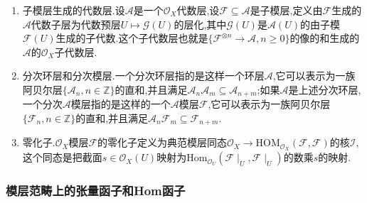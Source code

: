 \begin{enumerate}
\begin{itemize}
	\end{itemize}
	\item 子模层生成的代数层.设$\mathscr{A}$是一个$\mathscr{O}_X$代数层,设$\mathscr{F}\subseteq\mathscr{A}$是子模层,定义由$\mathscr{F}$生成的$\mathscr{A}$代数子层为代数预层$U\mapsto\mathscr{G}(U)$的层化,其中$\mathscr{G}(U)$是$\mathscr{A}(U)$的由子模$\mathscr{F}(U)$生成的子代数.这个子代数层也就是$\{\mathscr{F}^{\otimes n}\to\mathscr{A},n\ge0\}$的像的和生成的$\mathscr{A}$的$\mathscr{O}_X$子代数层.
	\item 分次环层和分次模层.一个分次环层指的是这样一个环层$\mathscr{A}$,它可以表示为一族阿贝尔层$\{\mathscr{A}_n,n\in\mathbb{Z}\}$的直和,并且满足$\mathscr{A}_n\mathscr{A}_m\subseteq\mathscr{A}_{n+m}$;如果$\mathscr{A}$是上述分次环层,一个分次$\mathscr{A}$模层指的是这样的一个$\mathscr{A}$模层$\mathscr{F}$,它可以表示为一族阿贝尔层$\{\mathscr{F}_n,n\in\mathbb{Z}\}$的直和,并且满足$\mathscr{A}_n\mathscr{F}_m\subseteq\mathscr{F}_{n+m}$.
	\item 零化子.$\mathscr{O}_X$模层$\mathscr{F}$的零化子定义为典范模层同态$\mathscr{O}_X\to\mathrm{HOM}_{\mathscr{O}_X}(\mathscr{F},\mathscr{F})$的核$\mathscr{I}$,这个同态是把截面$s\in\mathscr{O}_X(U)$映射为$\mathrm{Hom}_{\mathscr{O}_U}(\mathscr{F}\mid_U,\mathscr{F}\mid_U)$的数乘$s$的映射.
\end{enumerate}
\subsubsection{模层范畴上的张量函子和Hom函子}

